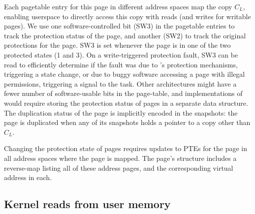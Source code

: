 \documentclass[letterpaper,twocolumn,10pt, anonymous]{article}
\begin{document}
Each pagetable entry for this page in different address spaces 
map the copy $C_L$, enabling userspace to directly access this
copy with reads (and writes for writable pages).
We use one software-controlled bit (SW3) in the pagetable entries 
to track the protection status of the page, and another (SW2)\footnotemark
to track the original protections for the page. 
SW3 is set whenever the page is in one of the two protected
states (1 and 3).
On a write-triggered protection fault, SW3 can be read to 
efficiently determine if the fault was due to \tiktok's protection 
mechanisms, triggering a state change, or due to buggy software
accessing a page with illegal permissions, triggering a signal to 
the task.
Other architectures might have a fewer number of software-usable 
bits in the page-table, and implementations of \tiktok would 
require storing the protection status of pages in a separate data structure.
The duplication status of the page is implicitly encoded in the 
snapshots: the page is duplicated when any of its snapshots
holds a pointer to a copy other than $C_L$.


Changing the protection state of pages requires updates to 
PTEs for the page in all address spaces where the page is mapped.
The page's  structure includes a reverse-map
listing all of these address pages, and the corresponding virtual
address in each.

\subsection{Kernel reads from user memory}
\end{document}
